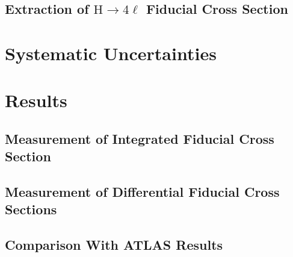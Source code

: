 \documentclass[
12pt, %
english, %
singlespacing, %
liststotoc, %
headsepline, %
]{MastersDoctoralThesis} %
\begin{document}
    \subsection{Extraction of $\mathrm{H}\to4\ell$ Fiducial Cross Section}\label{sec:Extraction}  %
\section{Systematic Uncertainties}\label{sec:Systematics}\label{sec:Systematics}
         \section{Results}\label{sec:Results} %
    \subsection{Measurement of Integrated Fiducial Cross Section}\label{sec:ResultsInclusiveXS}
    \subsection{Measurement of Differential Fiducial Cross Sections}\label{sec:ResultsDifferentialXS}
      
     \subsection{Comparison With ATLAS Results}\label{sec:atlas_results}  %
      


\end{document}
